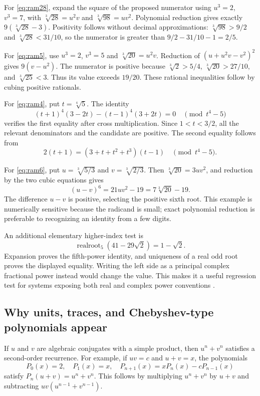 \documentclass[11pt,oneside]{article}
\numberwithin{equation}{section}
\theoremstyle{definition}
\theoremstyle{remark}
\begin{document}
For \eqref{eq:ram28}, expand the square of the proposed numerator using $u^3=2$, $v^3=7$, with $\sqrt[3]{28}=u^2v$ and $\sqrt[3]{98}=uv^2$. Polynomial reduction gives exactly $9(\sqrt[3]{28}-3)$. Positivity follows without decimal approximations: $\sqrt[3]{98}>9/2$ and $\sqrt[3]{28}<31/10$, so the numerator is greater than $9/2-31/10-1=2/5$.

For \eqref{eq:ram5}, use $u^3=2$, $v^3=5$ and $\sqrt[3]{20}=u^2v$. Reduction of $(u+u^2v-v^2)^2$ gives $9(v-u^2)$. The numerator is positive because $\sqrt[3]2>5/4$, $\sqrt[3]{20}>27/10$, and $\sqrt[3]{25}<3$. Thus its value exceeds $19/20$. These rational inequalities follow by cubing positive rationals.

For \eqref{eq:ram4}, put $t=\sqrt[4]5$. The identity
\[
(t+1)^4(3-2t)-(t-1)^4(3+2t)=0
\quad\pmod{t^4-5}
\]
verifies the first equality after cross multiplication. Since $1<t<3/2$, all the relevant denominators and the candidate are positive. The second equality follows from
\[
2(t+1)=(3+t+t^2+t^3)(t-1)
\quad\pmod{t^4-5}.
\]

For \eqref{eq:ram6}, put $u=\sqrt[3]{5/3}$ and $v=\sqrt[3]{2/3}$. Then $\sqrt[3]{20}=3uv^2$, and reduction by the two cubic equations gives
\[
(u-v)^6=21uv^2-19=7\sqrt[3]{20}-19.
\]
The difference $u-v$ is positive, selecting the positive sixth root. This example is numerically sensitive because the radicand is small; exact polynomial reduction is preferable to recognizing an identity from a few digits.

An additional elementary higher-index test is
\begin{equation}\label{eq:negativefifth}
\operatorname{realroot}_5(41-29\sqrt2)=1-\sqrt2.
\end{equation}
Expansion proves the fifth-power identity, and uniqueness of a real odd root proves the displayed equality. Writing the left side as a principal complex fractional power instead would change the value. This makes it a useful regression test for systems exposing both real and complex power conventions \cite{maxima}.

\subsection{Why units, traces, and Chebyshev-type polynomials appear}
If $u$ and $v$ are algebraic conjugates with a simple product, then $u^n+v^n$ satisfies a second-order recurrence. For example, if $uv=c$ and $u+v=x$, the polynomials
\[
P_0(x)=2,\quad P_1(x)=x,\quad
P_{n+1}(x)=xP_n(x)-cP_{n-1}(x)
\]
satisfy $P_n(u+v)=u^n+v^n$. This follows by multiplying $u^n+v^n$ by $u+v$ and subtracting $uv(u^{n-1}+v^{n-1})$.
\end{document}
